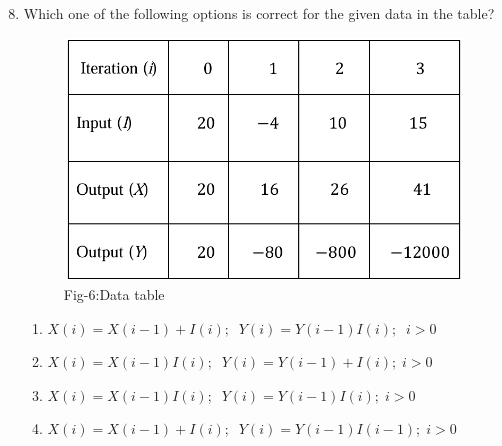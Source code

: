 \documentclass[journal]{IEEEtran}
\theoremstyle{remark}
\begin{document}
\begin{enumerate}[itemsep=1em]
\setcounter{enumi}{7}
\item Which one of the following options is correct for the given data in the table?  
\begin{figure}[H]
    \centering
    \includegraphics[width=0.4\columnwidth]{figs/fig-6.jpeg}
    \caption*{Fig-6:Data table}
    \label{fig:6}
\end{figure}
\begin{enumerate}[leftmargin=2.5em, labelsep=0.5em, itemsep=0.5em]
    \item $X(i)=X(i-1)+I(i);\;\;Y(i)=Y(i-1)I(i);\;\;i>0$
    \item $X(i)=X(i-1)I(i);\;\;Y(i)=Y(i-1)+I(i);\;i>0$
    \item $X(i)=X(i-1)I(i);\;\;Y(i)=Y(i-1)I(i);\;i>0$
    \item $X(i)=X(i-1)+I(i);\;\;Y(i)=Y(i-1)I(i-1);\;i>0$
\end{enumerate}
\end{enumerate}
\end{document}
